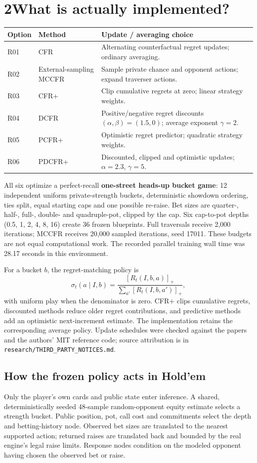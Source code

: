 \documentclass[10pt,letterpaper]{article}
\begin{document}
\section*{2\quad What is actually implemented?}
\begin{center}\small
\begin{tabularx}{\linewidth}{llX}
\toprule
Option & Method & Update / averaging choice \\
\midrule
R01 & CFR & Alternating counterfactual regret updates; ordinary averaging. \\
R02 & External-sampling MCCFR & Sample private chance and opponent actions; expand traverser actions. \\
R03 & CFR+ & Clip cumulative regrets at zero; linear strategy weights. \\
R04 & DCFR & Positive/negative regret discounts $(\alpha,\beta)=(1.5,0)$; average exponent $\gamma=2$. \\
R05 & PCFR+ & Optimistic regret predictor; quadratic strategy weights. \\
R06 & PDCFR+ & Discounted, clipped and optimistic updates; $\alpha=2.3$, $\gamma=5$. \\
\bottomrule
\end{tabularx}
\end{center}

All six optimize a perfect-recall \textbf{one-street heads-up bucket game}:
12 independent uniform private-strength buckets, deterministic showdown
ordering, ties split, equal starting caps and one possible re-raise. Bet sizes
are quarter-, half-, full-, double- and quadruple-pot, clipped by the cap.
Six cap-to-pot depths (0.5, 1, 2, 4, 8, 16) create 36 frozen blueprints.
Full traversals receive 2,000 iterations; MCCFR receives 20,000 sampled
iterations, seed 17011. These budgets are not equal computational work.
The recorded parallel training wall time was 28.17 seconds in this environment.

For a bucket $b$, the regret-matching policy is
\[
\sigma_t(a\mid I,b)=\frac{[R_t(I,b,a)]_+}{\sum_{a'}[R_t(I,b,a')]_+},
\]
with uniform play when the denominator is zero. CFR+ clips cumulative
regrets, discounted methods reduce older regret contributions, and predictive
methods add an optimistic next-increment estimate. The implementation retains
the corresponding average policy. Update schedules were checked against the
papers and the authors' MIT reference code; source attribution is in
\texttt{research/THIRD\_PARTY\_NOTICES.md}.

\subsection*{How the frozen policy acts in Hold'em}
Only the player's own cards and public state enter inference. A shared,
deterministically seeded 48-sample random-opponent equity estimate selects a
strength bucket. Public position, pot, call cost and commitments select the
depth and betting-history node. Observed bet sizes are translated to the
nearest supported action; returned raises are translated back and bounded by
the real engine's legal raise limits. Response nodes condition on the modeled
opponent having chosen the observed bet or raise.
\end{document}
